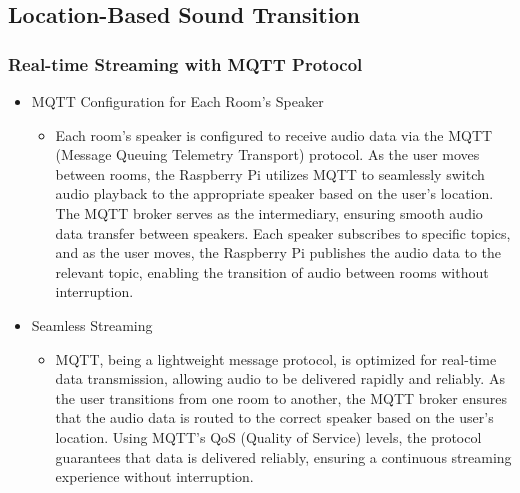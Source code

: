 \documentclass[conference]{IEEEtran}
\begin{document}
\subsection{Location-Based Sound Transition}

\subsubsection{Real-time Streaming with MQTT Protocol}
\begin{itemize}
    \item MQTT Configuration for Each Room’s Speaker
\begin{itemize}
    \item  Each room’s speaker is configured to receive audio data via the MQTT (Message Queuing Telemetry Transport) protocol. As the user moves between rooms, the Raspberry Pi utilizes MQTT to seamlessly switch audio playback to the appropriate speaker based on the user’s location. The MQTT broker serves as the intermediary, ensuring smooth audio data transfer between speakers. Each speaker subscribes to specific topics, and as the user moves, the Raspberry Pi publishes the audio data to the relevant topic, enabling the transition of audio between rooms without interruption.\\
\end{itemize}
\end{itemize}
\begin{itemize}
    \item Seamless Streaming
\begin{itemize}
    \item MQTT, being a lightweight message protocol, is optimized for real-time data transmission, allowing audio to be delivered rapidly and reliably. As the user transitions from one room to another, the MQTT broker ensures that the audio data is routed to the correct speaker based on the user’s location. Using MQTT’s QoS (Quality of Service) levels, the protocol guarantees that data is delivered reliably, ensuring a continuous streaming experience without interruption.\\
\end{itemize}
\end{itemize}
\end{document}
